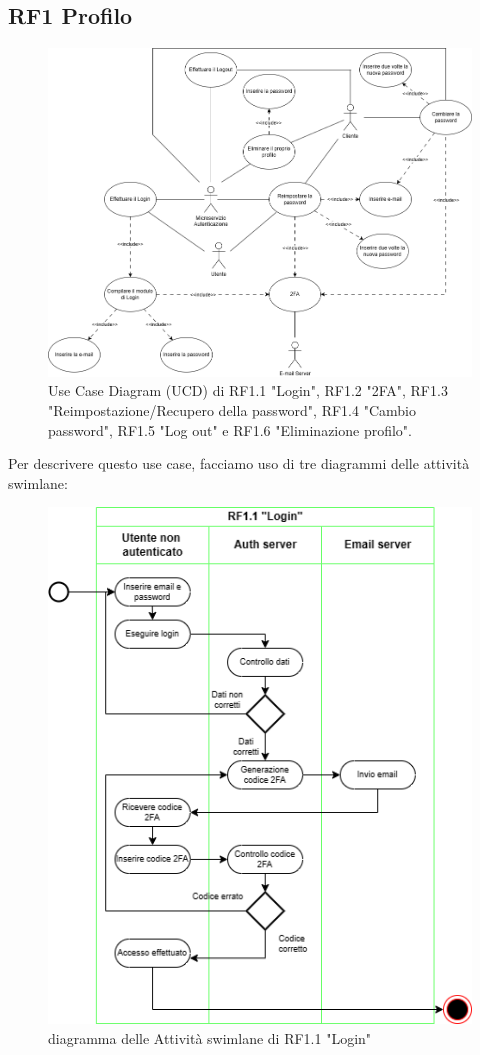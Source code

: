 \documentclass{report}
\begin{document}
\subsection*{RF1 Profilo }
\begin{figure}[H]
	\centering\includegraphics[width=1\textwidth]{images/UCD/RF1_login_UCD.png}
	Use Case Diagram (UCD) di RF1.1 "Login", RF1.2 "2FA", RF1.3 "Reimpostazione/Recupero della password", RF1.4 "Cambio password", RF1.5 "Log out" e RF1.6 "Eliminazione profilo".
\end{figure}
Per descrivere questo use case, facciamo uso di tre diagrammi delle attività swimlane:
\begin{figure}[H]
	\centering\includegraphics[width=1\textwidth]{images/Login_Swimlane.drawio.png}
	diagramma delle Attività swimlane di RF1.1 "Login"
\end{figure}
\end{document}
